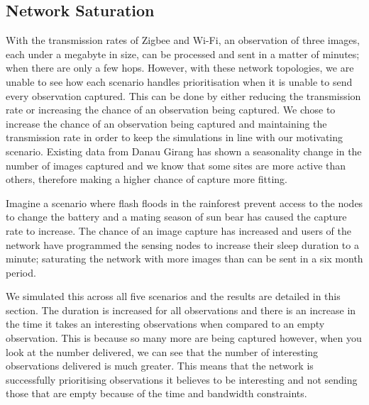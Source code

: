 \subsection{Network Saturation}

With the transmission rates of Zigbee and Wi-Fi, an observation of three images, each under a megabyte in size, can be processed and sent in a matter of minutes; when there are only a few hops. However, with these network topologies, we are unable to see how each scenario handles prioritisation when it is unable to send every observation captured. This can be done by either reducing the transmission rate or increasing the chance of an observation being captured. We chose to increase the chance of an observation being captured and maintaining the transmission rate in order to keep the simulations in line with our motivating scenario. Existing data from Danau Girang has shown a seasonality change in the number of images captured and we know that some sites are more active than others, therefore making a higher chance of capture more fitting. 

Imagine a scenario where flash floods in the rainforest prevent access to the nodes to change the battery and a mating season of sun bear has caused the capture rate to increase. The chance of an image capture has increased and users of the network have programmed the sensing nodes to increase their sleep duration to a minute; saturating the network with more images than can be sent in a six month period.

We simulated this across all five scenarios and the results are detailed in this section. The duration is increased for all observations and there is an increase in the time it takes an interesting observations when compared to an empty observation. This is because so many more are being captured however, when you look at the number delivered, we can see that the number of interesting observations delivered is much greater. This means that the network is successfully prioritising observations it believes to be interesting and not sending those that are empty because of the time and bandwidth constraints.

